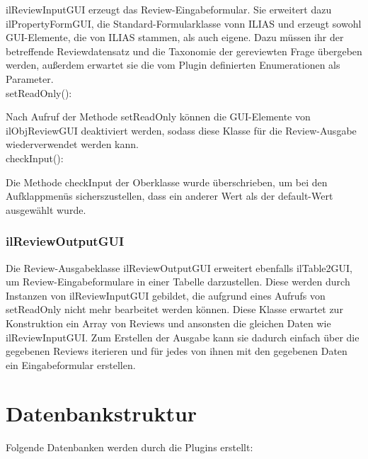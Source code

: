 \documentclass[a4paper]{scrreprt}
\begin{document}
ilReviewInputGUI erzeugt das Review-Eingabeformular. Sie erweitert dazu ilPropertyFormGUI, die Standard-Formularklasse vonn ILIAS und erzeugt sowohl GUI-Elemente, die von ILIAS stammen, als auch eigene. 
Dazu müssen ihr der betreffende Reviewdatensatz und die Taxonomie der gereviewten Frage übergeben werden, außerdem erwartet sie die vom Plugin definierten Enumerationen als Parameter. \\

setReadOnly():

Nach Aufruf der Methode setReadOnly können die GUI-Elemente von ilObjReviewGUI deaktiviert werden, sodass diese Klasse für die Review-Ausgabe wiederverwendet werden kann.\\

checkInput():

Die Methode checkInput der Oberklasse wurde überschrieben, um bei den Aufklappmenüs sicherszustellen, dass ein anderer Wert als der default-Wert ausgewählt wurde.

\subsubsection{ilReviewOutputGUI}

Die Review-Ausgabeklasse ilReviewOutputGUI erweitert ebenfalls ilTable2GUI, um Review-Eingabeformulare in einer Tabelle darzustellen. 
Diese werden durch Instanzen von ilReviewInputGUI gebildet, die aufgrund eines Aufrufs von setReadOnly nicht mehr bearbeitet werden können. 
Diese Klasse erwartet zur Konstruktion ein Array von Reviews und ansonsten die gleichen Daten wie ilReviewInputGUI. Zum Erstellen der Ausgabe kann sie dadurch einfach über die gegebenen Reviews iterieren und für jedes von ihnen mit den gegebenen Daten ein Eingabeformular erstellen.\\

\section{Datenbankstruktur}

Folgende Datenbanken werden durch die Plugins erstellt:\\
\end{document}
